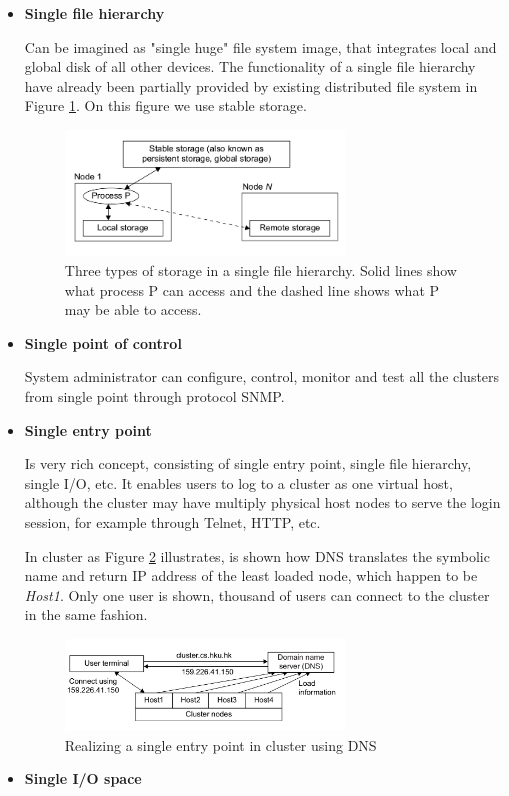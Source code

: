 \documentclass[12pt]{report}
\begin{document}
\begin{itemize}
\item \textbf{Single file hierarchy}

      Can be imagined as "single huge" file system image, that integrates local and global disk of all other devices.
      The functionality of a single file hierarchy have already been partially provided by existing distributed file system in Figure \ref{singlehier}. On this figure we use stable storage.
      \begin{figure}[ht]
      \centering
           \includegraphics[width=0.7\textwidth]{singlehier.png}
            \caption{Three types of storage in a single file hierarchy. Solid lines show what process P can access and the
      dashed line shows what P may be able to access.}
             \label{singlehier}
      \end{figure} 
\item \textbf{Single point of control}

		System administrator can configure, control, monitor and test all the clusters from single point through protocol SNMP.

\item \textbf{Single entry point}

      Is very rich concept, consisting of single entry point, single file hierarchy, single I/O, etc. It enables users to log to a cluster as one virtual host, although the cluster may have multiply physical host nodes to serve the login session, for example through Telnet, HTTP, etc.

      In cluster as Figure \ref{singleentry} illustrates, is shown how DNS translates the symbolic name and return IP address of the least loaded node, which happen to be \textit{Host1}. Only one user is shown, thousand of users can connect to the cluster in the same fashion. 
      \begin{figure}[ht]
      \centering
           \includegraphics[width=0.7\textwidth]{singleentry.png}
            \caption{Realizing a single entry point in cluster using DNS}
             \label{singleentry}
      \end{figure} 
\item \textbf{Single I/O space}


\end{itemize}
\end{document}
